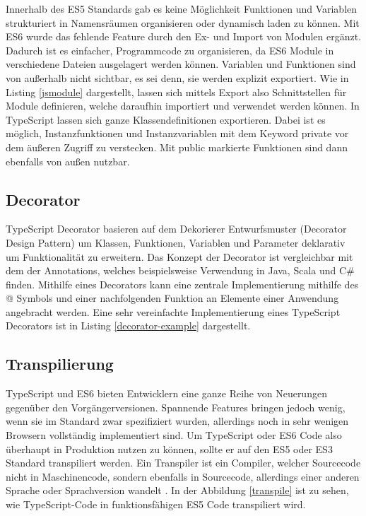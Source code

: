 Innerhalb des ES5 Standards gab es keine Möglichkeit Funktionen und Variablen strukturiert in Namensräumen organisieren oder dynamisch laden zu können.
Mit ES6 wurde das fehlende Feature durch den Ex- und Import von Modulen ergänzt. Dadurch ist es einfacher, Programmcode zu organisieren,
da ES6 Module in verschiedene Dateien ausgelagert werden können. Variablen und Funktionen sind von außerhalb nicht sichtbar, es sei denn, sie werden explizit exportiert.
Wie in Listing \ref{jsmodule} dargestellt, lassen sich mittels Export also Schnittstellen für Module definieren, welche daraufhin importiert und verwendet werden können.
In TypeScript lassen sich ganze Klassendefinitionen exportieren.
Dabei ist es möglich, Instanzfunktionen und Instanzvariablen mit dem Keyword private vor dem äußeren Zugriff zu verstecken.
Mit public markierte Funktionen sind dann ebenfalls von außen nutzbar.

\vspace{0.3cm}


\subsection{Decorator}

TypeScript Decorator basieren auf dem Dekorierer Entwurfsmuster (Decorator Design Pattern) um Klassen,
Funktionen, Variablen und Parameter deklarativ um Funktionalität zu erweitern.
Das Konzept der Decorator ist vergleichbar mit dem der Annotations, welches beispielsweise Verwendung in Java, Scala und C\#
finden.
Mithilfe eines Decorators kann eine zentrale Implementierung
mithilfe des @ Symbols und einer nachfolgenden Funktion an Elemente einer Anwendung angebracht werden.
Eine sehr vereinfachte Implementierung eines TypeScript Decorators ist in Listing \ref{decorator-example} dargestellt.

\vspace{0.3cm}

\vspace{0.3cm}


\subsection{Transpilierung}

TypeScript und ES6 bieten Entwicklern eine ganze Reihe von Neuerungen gegenüber den Vorgängerversionen.
Spannende Features bringen jedoch wenig, wenn sie im Standard zwar spezifiziert wurden,
allerdings noch in sehr wenigen Browsern vollständig implementiert sind.
Um TypeScript oder ES6 Code also überhaupt in Produktion nutzen zu können, sollte er auf den ES5 oder ES3
Standard transpiliert werden.
Ein Transpiler ist ein Compiler, welcher Sourcecode nicht in Maschinencode, sondern ebenfalls in Sourcecode,
allerdings einer anderen Sprache oder Sprachversion wandelt \cite{Introduction-to-the-Typescript-Transpiler}.
In der Abbildung \ref{transpile} ist zu sehen, wie TypeScript-Code in funktionsfähigen ES5 Code transpiliert wird.

